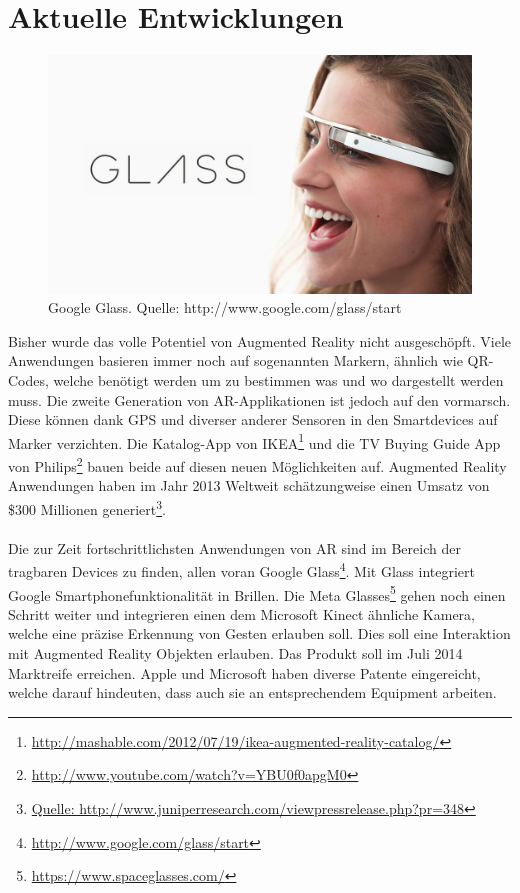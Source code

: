 \section{Aktuelle Entwicklungen}

\begin{figure}[!ht]
\centering
\includegraphics[scale=0.3]{images/google-glass} 
\caption{Google Glass. Quelle: http://www.google.com/glass/start}
\label{fig:google-glass}
\end{figure}

Bisher wurde das volle Potentiel von Augmented Reality nicht ausgeschöpft. Viele Anwendungen basieren immer noch auf sogenannten Markern, ähnlich wie QR-Codes, welche benötigt werden um zu bestimmen was und wo dargestellt werden muss. Die zweite Generation von AR-Applikationen ist jedoch auf den vormarsch. Diese können dank GPS und diverser anderer Sensoren in den Smartdevices auf Marker verzichten. Die Katalog-App von IKEA\footnote{\protect\url{http://mashable.com/2012/07/19/ikea-augmented-reality-catalog/}} und die TV Buying Guide App von Philips\footnote{\protect\url{http://www.youtube.com/watch?v=YBU0f0apgM0}} bauen beide auf diesen neuen Möglichkeiten auf. Augmented Reality Anwendungen haben im Jahr 2013 Weltweit schätzungweise einen Umsatz von \$300 Millionen generiert\footnote{\protect\url{Quelle: http://www.juniperresearch.com/viewpressrelease.php?pr=348}}.
\paragraph{}
Die zur Zeit fortschrittlichsten Anwendungen von AR sind im Bereich der tragbaren Devices zu finden, allen voran Google Glass\footnote{\protect\url{http://www.google.com/glass/start}}. Mit Glass integriert Google Smartphonefunktionalität in Brillen. Die Meta Glasses\footnote{\protect\url{https://www.spaceglasses.com/}} gehen noch einen Schritt weiter und integrieren einen dem Microsoft Kinect ähnliche Kamera, welche eine präzise Erkennung von Gesten erlauben soll. Dies soll eine Interaktion mit Augmented Reality Objekten erlauben. Das Produkt soll im Juli 2014 Marktreife erreichen. Apple und Microsoft haben diverse Patente eingereicht, welche darauf hindeuten, dass auch sie an entsprechendem Equipment arbeiten.